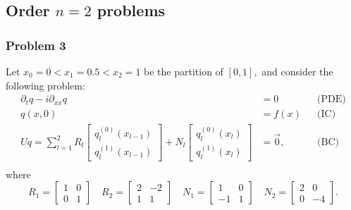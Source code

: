 \documentclass[11pt,reqno,oneside,a4paper]{article}
\theoremstyle{plain} %
\theoremstyle{definition}
\theoremstyle{remark}
\begin{document}
\subsection*{Order $n = 2$ problems}
\subsubsection*{Problem 3}
Let $x_0 = 0 < x_1  = 0.5 < x_2 = 1$ be the partition of $[0,1],$ and consider the following problem:
\begin{align*}
\partial_t q - i \partial_{xx} q &= 0 &&\text{(PDE)} \\
q(x, 0) &= f(x) &&\text{(IC)} \\
Uq = \sum^2_{l=1} R_l \begin{bmatrix} q_l^{(0)}(x_{l-1}) \\ q_l^{(1)}(x_{l-1}) \end{bmatrix} + N_l \begin{bmatrix} q_l^{(0)}(x_{l}) \\ q_l^{(1)}(x_{l}) \end{bmatrix} &= \vec{0}, &&\text{(BC)} \\
\end{align*}
where 
\begin{equation*}
R_1 = \begin{bmatrix} 1 & 0\\ 0 & 1 \end{bmatrix} \quad R_2= \begin{bmatrix} 2 & -2  \\ 1 & 1\end{bmatrix} \quad N_1 = \begin{bmatrix} 1 & 0 \\ -1 & 1 \end{bmatrix} \quad N_2 = \begin{bmatrix} 2 & 0 \\ 0 & -4 \end{bmatrix}.
\end{equation*}
\end{document}
